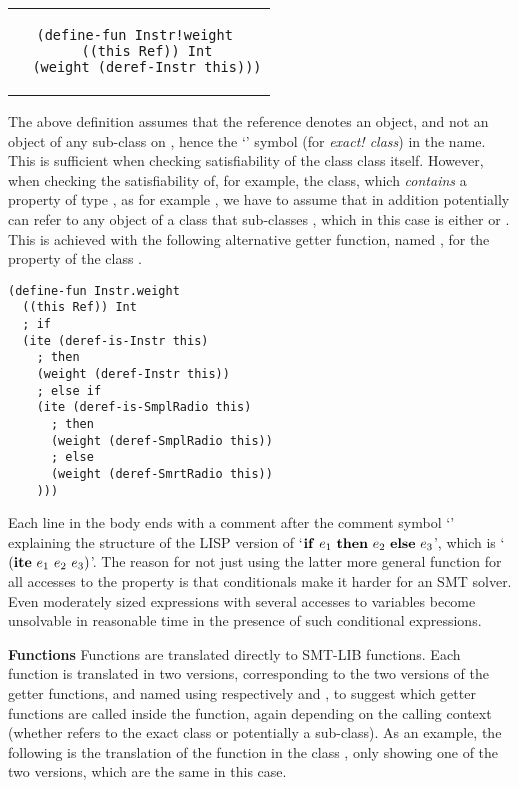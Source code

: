 \begin{center}
\begin{tabular}{c}
\small
\begin{lstlisting}
(define-fun Instr!weight 
  ((this Ref)) Int
  (weight (deref-Instr this)))
\end{lstlisting}
\end{tabular}
\end{center}

\noindent The above definition assumes that the  reference
denotes an  object, and not an object of any
sub-class on , hence the `\code{!}' symbol (for {\em
  exact!  class}) in the name.  This is sufficient when checking
satisfiability of the class  class itself. However,
when checking the satisfiability of, for example, the
 class, which {\em contains} a property of type
, as for example , we have
to assume that  in addition potentially can refer to any
object of a class that sub-classes , which in this
case is either  or . This is
achieved with the following alternative getter function, named
, for the  property of the class
.

\begin{center}
\small
\begin{lstlisting}
(define-fun Instr.weight 
  ((this Ref)) Int
  ; if
  (ite (deref-is-Instr this)         
    ; then
    (weight (deref-Instr this))      
    ; else if
    (ite (deref-is-SmplRadio this)      
      ; then
      (weight (deref-SmplRadio this))   
      ; else
      (weight (deref-SmrtRadio this))
    )))
\end{lstlisting}
\end{center}

\noindent Each line in the body ends with a comment after the comment
symbol `\code{;}' explaining the structure of the LISP version of
`${\bf if}\ e_1\ {\bf then}\ e_2\ {\bf else}\ e_3$', which is `$({\bf
  ite}\ e_1\ e_2\ e_3)$'. The reason for not just using the latter
more general function  for all accesses to the
 property is that conditionals make it harder for an SMT
solver. Even moderately sized expressions with several accesses to
variables become unsolvable in reasonable time in the presence of such
conditional expressions.

\textbf{Functions} Functions are translated directly to SMT-LIB
functions.  Each function is translated in two versions, corresponding
to the two versions of the getter functions, and named using
respectively  and
, to suggest which getter functions are
called inside the function, again depending on the calling context
(whether  refers to the exact class or potentially a
sub-class). As an example, the following is the translation of the
 function in the class , only showing one of
the two versions, which are the same in this case.

